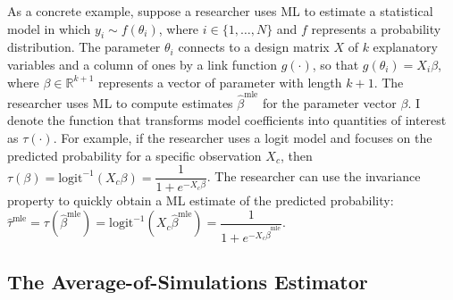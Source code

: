 \documentclass[12pt]{article}
\begin{document}
As a concrete example, suppose a researcher uses ML to estimate a statistical model in which $y_i \sim f(\theta_i)$, where $i \in \{1,\ldots, N\}$ and $f$ represents a probability distribution. 
The parameter $\theta_i$ connects to a design matrix $X$ of $k$ explanatory variables and a column of ones by a link function $g(\cdot)$, so that $g(\theta_i) = X_i\beta$, where $\beta \in \mathbb{R}^{k+1}$ represents a vector of parameter with length $k + 1$. 
The researcher uses ML to compute estimates $\hat{\beta}^{\text{mle}}$ for the parameter vector $\beta$. 
I denote the function that transforms model coefficients into quantities of interest as $\tau(\cdot)$. 
For example, if the researcher uses a logit model and focuses on the predicted probability for a specific observation $X_c$, then $\tau(\beta) = \text{logit}^{-1}( X_c \beta) = \dfrac{1}{1 + e^{-X_c\beta}}$. 
The researcher can use the invariance property to quickly obtain a ML estimate of the predicted probability: $\hat{\tau}^{\text{mle}} = \tau \left( \hat{\beta}^{\text{mle}}\right) = \text{logit}^{-1} \left( X_c \hat{\beta}^{\text{mle}} \right) = \dfrac{1}{1 + e^{-X_c \hat{\beta}^{\text{mle}}}}$.


\subsection*{The Average-of-Simulations Estimator}
\end{document}
